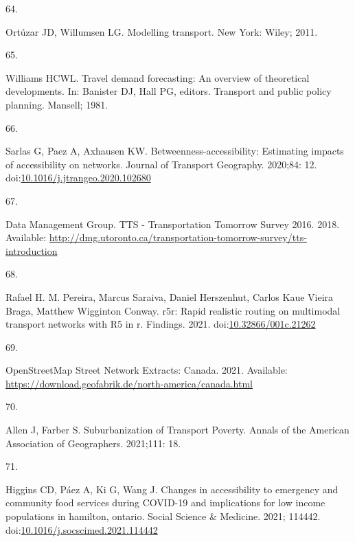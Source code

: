 \documentclass[10pt,letterpaper]{article}
\newlength{\cslhangindent}
\newlength{\csllabelwidth}
\newlength{\cslentryspacingunit} %
\newenvironment{CSLReferences}[2] %
 {%
  \setlength{\parindent}{0pt}
  \ifodd #1
  \let\oldpar\par
  \def\par{\hangindent=\cslhangindent\oldpar}
  \fi
  \setlength{\parskip}{#2\cslentryspacingunit}
 }%
 {}
\newcommand{\CSLLeftMargin}[1]{\parbox[t]{\csllabelwidth}{#1}}
\newcommand{\CSLRightInline}[1]{\parbox[t]{\linewidth - \csllabelwidth}{#1}\break}
\begin{document}
\begin{CSLReferences}{0}{0}
\leavevmode{}%
\CSLLeftMargin{64. }%
\CSLRightInline{Ortúzar JD, Willumsen LG. Modelling transport. New York:
Wiley; 2011. }

\leavevmode{}%
\CSLLeftMargin{65. }%
\CSLRightInline{Williams HCWL. Travel demand forecasting: An overview of
theoretical developments. In: Banister DJ, Hall PG, editors. Transport
and public policy planning. Mansell; 1981. }

\leavevmode{}%
\CSLLeftMargin{66. }%
\CSLRightInline{Sarlas G, Paez A, Axhausen KW.
Betweenness-accessibility: Estimating impacts of accessibility on
networks. Journal of Transport Geography. 2020;84: 12.
doi:\href{https://doi.org/10.1016/j.jtrangeo.2020.102680}{10.1016/j.jtrangeo.2020.102680}}

\leavevmode{}%
\CSLLeftMargin{67. }%
\CSLRightInline{Data Management Group. {TTS} - {Transportation}
{Tomorrow} {Survey} 2016. 2018. Available:
\url{http://dmg.utoronto.ca/transportation-tomorrow-survey/tts-introduction}}

\leavevmode{}%
\CSLLeftMargin{68. }%
\CSLRightInline{Rafael H. M. Pereira, Marcus Saraiva, Daniel Herszenhut,
Carlos Kaue Vieira Braga, Matthew Wigginton Conway. r5r: Rapid realistic
routing on multimodal transport networks with R5 in r. Findings. 2021.
doi:\href{https://doi.org/10.32866/001c.21262}{10.32866/001c.21262}}

\leavevmode{}%
\CSLLeftMargin{69. }%
\CSLRightInline{{OpenStreetMap Street Network Extracts}: {Canada}. 2021.
Available:
\url{https://download.geofabrik.de/north-america/canada.html}}

\leavevmode{}%
\CSLLeftMargin{70. }%
\CSLRightInline{Allen J, Farber S. Suburbanization of {Transport}
{Poverty}. Annals of the American Association of Geographers. 2021;111:
18. }

\leavevmode{}%
\CSLLeftMargin{71. }%
\CSLRightInline{Higgins CD, Páez A, Ki G, Wang J. Changes in
accessibility to emergency and community food services during COVID-19
and implications for low income populations in hamilton, ontario. Social
Science \& Medicine. 2021; 114442.
doi:\href{https://doi.org/10.1016/j.socscimed.2021.114442}{10.1016/j.socscimed.2021.114442}}


\end{CSLReferences}
\end{document}
